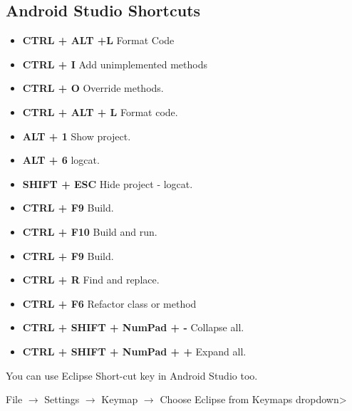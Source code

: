 \documentclass[10pt,a4paper]{article}
\begin{document}
\subsection{Android Studio Shortcuts}
\begin{itemize}
	\item \textbf{CTRL + ALT +L} Format Code
	\item \textbf{CTRL + I} Add unimplemented methods
	\item \textbf{CTRL + O} Override methods.
	\item \textbf{CTRL + ALT + L} Format code.
	\item \textbf{ALT + 1} Show project.
	\item \textbf{ALT + 6}  logcat.
	\item \textbf{SHIFT + ESC} Hide project - logcat.
	\item \textbf{CTRL + F9} Build.
	\item \textbf{CTRL + F10} Build and run.
	\item \textbf{CTRL + F9} Build.
	\item \textbf{CTRL + R} Find and replace.
	\item \textbf{CTRL + F6} Refactor class or method
	\item \textbf{CTRL + SHIFT + NumPad + -} Collapse all.
	\item \textbf{CTRL + SHIFT + NumPad + +} Expand all.
\end{itemize}
	

You can use Eclipse Short-cut key in Android Studio too.

File $\rightarrow$ Settings $\rightarrow$ Keymap $\rightarrow$ Choose Eclipse from Keymaps dropdown>
\end{document}
